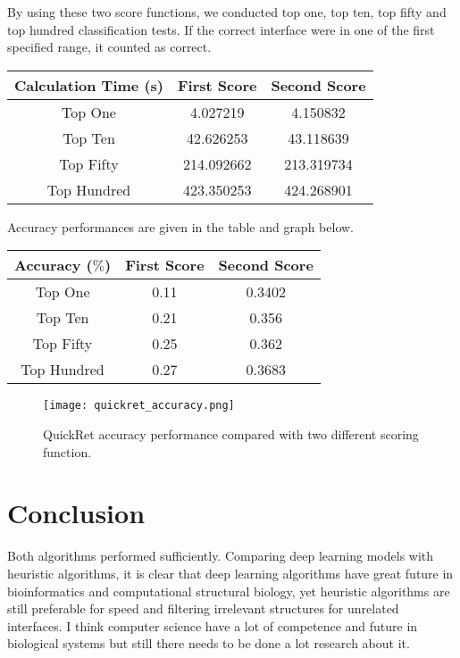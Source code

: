 \documentclass{article}
\begin{document}
By using these two score functions, we conducted top one, top ten, top fifty and top hundred classification tests. If the correct interface were in one of the first specified range, it counted as correct.

\begin{table}[H]
\centering
    \begin{tabular}{|c|c|c|}
        \hline
        Calculation Time (s) & First Score & Second Score \\ \hline
        Top One              & 4.027219    & 4.150832     \\ 
        Top Ten              & 42.626253   & 43.118639    \\ 
        Top Fifty            & 214.092662  & 213.319734   \\ 
        Top Hundred          & 423.350253  & 424.268901   \\
        \hline
    \end{tabular}
\end{table}

Accuracy performances are given in the table and graph below.

\begin{table}[H]
\centering
    \begin{tabular}{|c|c|c|}
        \hline
        Accuracy ($\%$) & First Score & Second Score \\ \hline
        Top One              & 0.11 & 0.3402 \\ 
        Top Ten              & 0.21 & 0.356 \\ 
        Top Fifty            & 0.25 & 0.362 \\ 
        Top Hundred          & 0.27 & 0.3683 \\
        \hline
    \end{tabular}
\end{table}

\begin{figure}[H]
   \begin{minipage}{\textwidth}
     \centering
     \texttt{[image: quickret\_accuracy.png]}
     \caption{QuickRet accuracy performance compared with two different scoring function.}\label{Fig:Data1}
   \end{minipage}
\end{figure}

\section{Conclusion}
Both algorithms performed sufficiently. Comparing deep learning models with heuristic algorithms, it is clear that deep learning algorithms have great future in bioinformatics and computational structural biology, yet heuristic algorithms are still preferable for speed and filtering irrelevant structures for unrelated interfaces. I think computer science have a lot of competence and future in biological systems but still there needs to be done a lot research about it.




\end{document}
